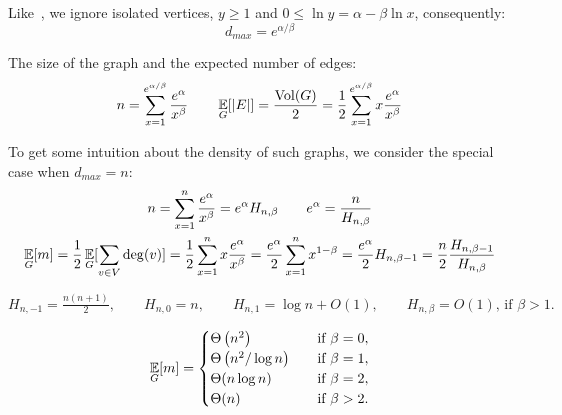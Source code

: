 Like~\cite{acl01}, we ignore isolated vertices, $y\geq1$
and $0\leq\ln y=\alpha-\beta\ln x$, consequently:
\begin{equation}
    d_{max}=e^{\alpha/\beta}
\end{equation}

The size of the graph and the expected number of edges:
\begin{equation}
    \label{eq:powerlaw-coin-toss-n-e}
    n=\sum_{x=1}^{e^{\alpha/\beta}}{\frac{e^\alpha}{x^\beta}}
    \qquad \mathop{{}\mathbb{E}}_G[|E|]=\frac{\operatorname*{Vol}(G)}{2}=\frac{1}{2}\sum_{x=1}^{e^{\alpha/\beta}}{x\frac{e^\alpha}{x^\beta}}
\end{equation}

%
%
%
%

To get some intuition about the density of such graphs,
we consider the special case when $d_{max}=n$:
\begin{gather}
    n=\sum_{x=1}^{n}\frac{e^\alpha}{x^\beta}=e^\alpha H_{n,\beta} \qquad e^\alpha=\frac{n}{H_{n,\beta}}\\
    \mathop{{}\mathbb{E}}_G[m]=\frac{1}{2}\mathop{{}\mathbb{E}}_G[\sum_{v \in V}\deg(v)]=\frac{1}{2}\sum_{x=1}^{n}x\frac{e^\alpha}{x^\beta}
    =\frac{e^\alpha}{2}\sum_{x=1}^{n}x^{1-\beta}=\frac{e^\alpha}{2}H_{n,\beta-1}
    =\frac{n}{2}\frac{H_{n,\beta-1}}{H_{n,\beta}}
\end{gather}

$H_{n,-1}=\frac{n(n+1)}{2},
\qquad H_{n,0}=n,
\qquad H_{n,1}=\log n+O(1),
\qquad H_{n,\beta}=O(1)\text{, if }\beta>1.$

\begin{equation}
    \mathop{{}\mathbb{E}}_G[m]=
    \begin{cases}
        \Theta\left(n^2\right) & \quad \text{if } \beta=0,\\
        \Theta\left(n^2/\log n\right) & \quad \text{if } \beta=1,\\
        \Theta(n\log n) & \quad \text{if } \beta=2,\\
        \Theta(n) & \quad \text{if } \beta>2.
    \end{cases}
\end{equation}

